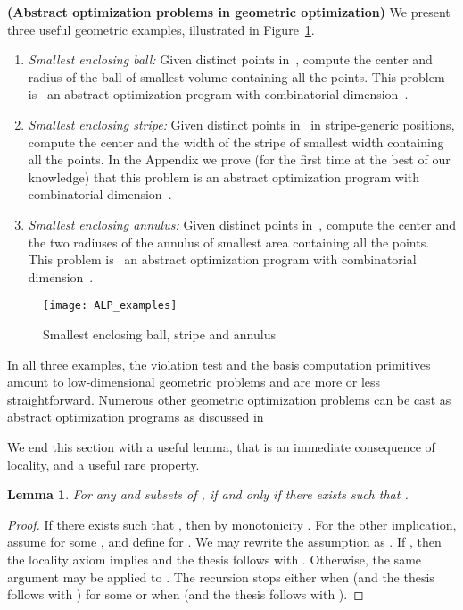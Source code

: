 \documentclass[onecolumn,journal,letterpaper]{IEEEtran}
\newtheorem{lemma}[theorem]{Lemma}
{\theorembodyfont{\rmfamily} \newtheorem{conjecture}[theorem]{Conjecture}
\newtheorem{remark}[theorem]{Remark}
\newtheorem{remarks}[theorem]{Remarks}
\newtheorem{example}[theorem]{Example}
\newtheorem{algo}[theorem]{Algorithm}
\newtheorem{problem}[theorem]{Problem}}
\newcommand\oprocendsymbol{\hbox{}}
\newcommand\oprocend{\relax\ifmmode\else\unskip\hfill\fi\oprocendsymbol}
\begin{document}
\begin{example}\textbf{\textup{(Abstract optimization problems in
    geometric optimization)}}
  \label{rem:examples}
  We present three useful geometric examples, illustrated in
  Figure~\ref{fig:geometric-alp}.
  \begin{enumerate}
  \item \emph{Smallest enclosing ball:} Given  distinct points
    in~, compute the center and radius of the ball of smallest
    volume containing all the points.  This problem is~\cite{JM-MS-EW:96}
    an abstract optimization program with combinatorial dimension~.


  \item \emph{Smallest enclosing stripe:}
Given  distinct points in~ in stripe-generic positions,
    compute the center and the width of the stripe of smallest width
    containing all the points. In the Appendix we prove (for the first time
    at the best of our knowledge) that this problem is an abstract
    optimization program with combinatorial dimension~.

  \item \emph{Smallest enclosing annulus:} Given  distinct points
    in~, compute the center and the two radiuses of the annulus of
    smallest area containing all the points.  This problem
    is~\cite{JM-MS-EW:96} an abstract optimization program with
    combinatorial dimension~.
  \end{enumerate}
  \begin{figure}[htbp]
    \centering
\texttt{[image: ALP\_examples]}\caption{Smallest enclosing ball, stripe and annulus}
    \label{fig:geometric-alp}
  \end{figure}
  In all three examples, the violation test and the basis computation
  primitives amount to low-dimensional geometric problems and are more or
  less straightforward. Numerous other geometric optimization problems can
  be cast as abstract optimization programs as discussed
  in~\cite{JM-MS-EW:96,BG:95,BG-EW:96,PKA-SS:01} \oprocend
\end{example}

We end this section with a useful lemma, that is an immediate consequence
of locality, and a useful rare property.
\begin{lemma}
  \label{lemma:locality2} For any  and  subsets of ,
   if and only if there exists  such that
  .
\end{lemma}
\begin{proof}
  If there exists  such that , then by
  monotonicity . For the
  other implication, assume  for some ,
  and define  for . We may
  rewrite the assumption  as . If , then
  the locality axiom implies  and the thesis
  follows with . Otherwise, the same argument may be applied to
  . The recursion stops either when 
  (and the thesis follows with ) for some  or when
   (and the thesis follows with ).
\end{proof}
\end{document}
